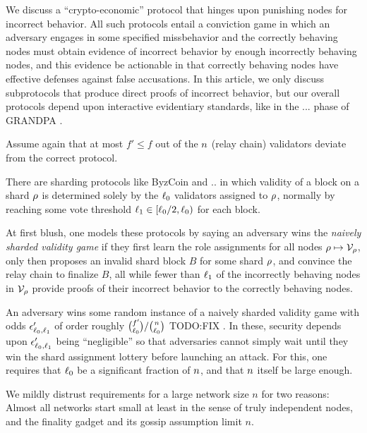 We discuss a ``crypto-economic'' protocol that hinges upon punishing nodes for incorrect behavior.  All such protocols entail a conviction game in which an adversary engages in some specified missbehavior and the correctly behaving nodes must obtain evidence of incorrect behavior by enough incorrectly behaving nodes, and this evidence be actionable in that correctly behaving nodes have effective defenses against false accusations.  
In this article, we only discuss subprotocols that produce direct proofs of incorrect behavior, but our overall protocols depend upon interactive evidentiary standards, like in the ... phase of GRANDPA \cite{??}.

Assume again that at most $f' \le f$ out of the $n$ (relay chain) validators deviate from the correct protocol.


There are sharding protocols like ByzCoin \cite{ByzCoin} and .. in which validity of a block on a shard $\rho$ is determined solely by the $\ell_0$ validators assigned to $\rho$, normally by reaching some vote threshold $\ell_1 \in [\ell_0/2,\ell_0)$ for each block.

At first blush, one models these protocols by saying an adversary wins the {\em naively sharded validity game} if they first learn the role assignments for all nodes $\rho \mapsto \mathcal{V}_{\rho}$, only then proposes an invalid shard block $B$ for some shard $\rho$, and convince the relay chain to finalize $B$, all while fewer than $\ell_1$ of the incorrectly behaving nodes in $\mathcal{V}_{\rho}$ provide proofs of their incorrect behavior to the correctly behaving nodes.  

An adversary wins some random instance of a naively sharded validity game with odds $\epsilon'_{\ell_0,\ell_1}$ of order roughly ${f' \choose \ell_0} / {n \choose \ell_0}$ TODO:FIX \cite{??}.  
In these, security depends upon $\epsilon'_{\ell_0,\ell_1}$ being ``negligible'' so that adversaries cannot simply wait until they win the shard assignment lottery before launching an attack.  For this, one requires that $\ell_0$ be a significant fraction of $n$, and that $n$ itself be large enough. 


We mildly distrust requirements for a large network size $n$ for two reasons: Almost all networks start small at least in the sense of truly independent nodes, and the finality gadget and its gossip assumption limit $n$.  

